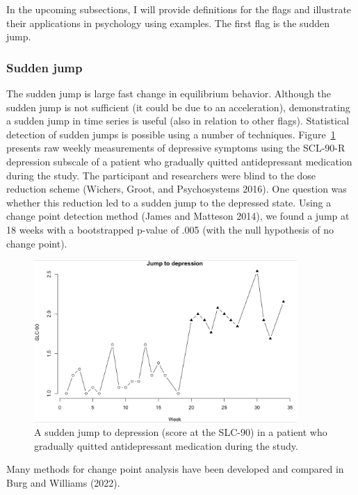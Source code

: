 \documentclass[
  letterpaper,
]{scrbook}
\begin{document}
In the upcoming subsections, I will provide definitions for the flags
and illustrate their applications in psychology using examples. The
first flag is the sudden jump.

\hypertarget{sudden-jump}{%
\subsubsection{Sudden jump}\label{sudden-jump}}

The sudden jump is large fast change in equilibrium behavior. Although
the sudden jump is not sufficient (it could be due to an acceleration),
demonstrating a sudden jump in time series is useful (also in relation
to other flags). Statistical detection of sudden jumps is possible using
a number of techniques. Figure~\ref{fig-ch3-img19-old-31} presents raw
weekly measurements of depressive symptoms using the SCL-90-R depression
subscale of a patient who gradually quitted antidepressant medication
during the study. The participant and researchers were blind to the dose
reduction scheme (Wichers, Groot, and Psychosystems 2016). One question
was whether this reduction led to a sudden jump to the depressed state.
Using a change point detection method (James and Matteson 2014), we
found a jump at 18 weeks with a bootstrapped p-value of .005 (with the
null hypothesis of no change point).

\begin{figure}

{\centering \includegraphics[width=3.93629in,height=\textheight]{media/ch3/image19.jpg}

}

\caption{\label{fig-ch3-img19-old-31}A sudden jump to depression (score
at the SLC-90) in a patient who gradually quitted antidepressant
medication during the study.}

\end{figure}

Many methods for change point analysis have been developed and compared
in Burg and Williams (2022).
\end{document}
